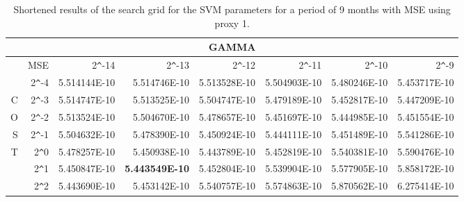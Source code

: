 \begin{table}[h!]
\centering
\begin{adjustbox}{width=\textwidth}
\begin{tabular}{|r|r|rrrrrr|}
\hline
\multicolumn{8}{|c|}{GAMMA} \tabularnewline
\hline
  &MSE&  2\verb|^|-14 & 2\verb|^|-13 & 2\verb|^|-12 & 2\verb|^|-11 & 2\verb|^|-10 & 2\verb|^|-9 \\ 
  \hline
  &2\verb|^|-4 & 5.514144E-10 & 5.514746E-10 & 5.513528E-10 & 5.504903E-10 & 5.480246E-10 & 5.453717E-10 \\ 
  C&2\verb|^|-3 & 5.514747E-10 & 5.513525E-10 & 5.504747E-10 & 5.479189E-10 & 5.452817E-10 & 5.447209E-10 \\ 
  O&2\verb|^|-2 & 5.513524E-10 & 5.504670E-10 & 5.478657E-10 & 5.451697E-10 & 5.444985E-10 & 5.451554E-10 \\ 
  S&2\verb|^|-1 & 5.504632E-10 & 5.478390E-10 & 5.450924E-10 & 5.444111E-10 & 5.451489E-10 & 5.541286E-10 \\ 
  T&2\verb|^|0 & 5.478257E-10 & 5.450938E-10 & 5.443789E-10 & 5.452819E-10 & 5.540381E-10 & 5.590476E-10 \\ 
  &2\verb|^|1 & 5.450847E-10 & \textbf{5.443549E-10} & 5.452804E-10 & 5.539904E-10 & 5.577905E-10 & 5.858172E-10 \\ 
  &2\verb|^|2 & 5.443690E-10 & 5.453142E-10 & 5.540757E-10 & 5.574863E-10 & 5.870562E-10 & 6.275414E-10 \\ 
   \hline
\end{tabular}
\end{adjustbox}
\caption{Shortened results of the search grid for the SVM parameters for a period of 9 months with MSE using proxy 1.}
\end{table}
